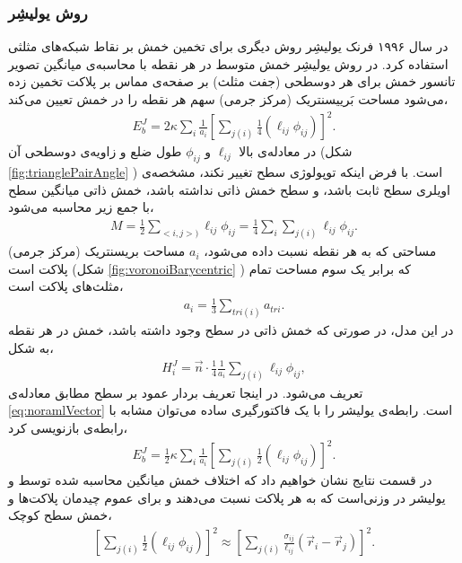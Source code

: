 \subsubsection{
روش یولیشِر
}
در سال ۱۹۹۶ فرنک یولیشِر 
\cite{Julicher1996}
روش دیگری برای تخمین خمش بر نقاط شبکه‌های مثلثی استفاده کرد. در روش یولیشِر خمش متوسط در هر نقطه با محاسبه‌ی  میانگین تصویر تانسور خمش برای هر دوسطحی (جفت مثلث‌) بر صفحه‌ی مماس بر پلاکت  تخمین زده می‌شود
\cite{Ramakrishnan2011}
مساحت بَرییسنتریک
(مرکز جرمی) سهم هر نقطه را در خمش تعیین می‌کند،
\begin{eqnarray}
E_{b}^{J}=2\kappa\sum_{i}\frac{1}{a_i}\left[\sum_{j(i)}\frac{1}{4}(\ell_{ij}\phi_{ij})\right]^2.
\label{eq:JulicherPotential}
\end{eqnarray}
در معادله‌ی بالا 
$\ell_{ij}$
و
$\phi_{ij}$
طول ضلع و زاویه‌ی دوسطحی آن (شکل
\ref{fig:trianglePairAngle}
) است. با فرض اینکه توپولوژی سطح تغییر نکند، مشخصه‌ی اویلری سطح ثابت باشد، و سطح خمش ذاتی نداشته باشد، خمش ذاتی میانگین سطح با جمع زیر محاسبه می‌شود، 
\begin{eqnarray}
M=\frac{1}{2}\sum_{<i,j>)}\ell_{ij}\phi_{ij} = \frac{1}{4}\sum_i\sum_{j(i)}\ell_{ij}\phi_{ij}.
\label{eq:JulicherTotalMeanCurvature}
\end{eqnarray}
مساحتی که به هر نقطه نسبت داده می‌شود،
$a_i$
مساحت بریسنتریک (مرکز جرمی) پلاکت است (شکل
\ref{fig:voronoiBarycentric}
) که برابر یک سوم مساحت تمام مثلث‌های پلاکت است، 
\begin{eqnarray}
a_i=\frac{1}{3}\sum_{tri (i)}a_{tri}.
\label{eq:BarycentricArea}
\end{eqnarray}
در این مدل، در صورتی که خمش ذاتی در سطح وجود داشته باشد، خمش در هر نقطه به شکل،
\begin{eqnarray}
H_i^J=\vec n\cdot\frac{1}{4}\frac{1}{a_i}\sum_{j(i)}\ell_{ij}\phi_{ij},
\label{eq:meanCurvatureDiscreteSingleVertexJulicher}
\end{eqnarray}
تعریف می‌شود. در اینجا تعریف بردار عمود بر سطح مطابق معادله‌ی
\ref{eq:noramlVector}
است. رابطه‌ی یولیشر را با یک فاکتورگیری ساده می‌توان مشابه با رابطه‌ی  بازنویسی کرد،
\begin{eqnarray}
E_{b}^{J}=\frac{1}{2}\kappa\sum_{i}\frac{1}{a_i}\left[\sum_{j(i)}\frac{1}{2}(\ell_{ij}\phi_{ij})\right]^2.
\label{eq:JulicherPotentialHalf}
\end{eqnarray}
در قسمت نتایج نشان خواهیم داد که اختلاف خمش میانگین محاسبه شده توسط  و یولیشر در وزنی‌است که به هر پلاکت نسبت می‌دهند و برای عموم چیدمان‌ پلاکت‌ها و خمش سطح کوچک،
\begin{eqnarray}
\left[\sum_{j(i)}\frac{1}{2}(\ell_{ij}\phi_{ij})\right]^2\approx\left[\sum_{j(i)}\frac{\sigma_{ij}}{\ell_{ij}}(\vec r_i-\vec r_j)\right]^2.
\label{eq:JulicherItzyksonNumerator}
\end{eqnarray}


